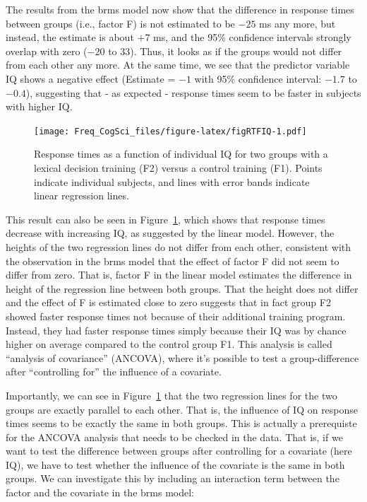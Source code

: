 \documentclass[12pt,]{krantz}
\begin{document}
The results from the brms model now show that the difference in response times between groups (i.e., factor F) is not estimated to be \(-25\) ms any more, but instead, the estimate is about \(+7\) ms, and the 95\% confidence intervals strongly overlap with zero (\(-20\) to \(33\)). Thus, it looks as if the groups would not differ from each other any more. At the same time, we see that the predictor variable IQ shows a negative effect (Estimate = \(-1\) with 95\% confidence interval: \(-1.7\) to \(-0.4\)), suggesting that - as expected - response times seem to be faster in subjects with higher IQ.

\begin{figure}
\centering
\texttt{[image: Freq\_CogSci\_files/figure-latex/figRTFIQ-1.pdf]}
\caption{\label{fig:figRTFIQ}Response times as a function of individual IQ for two groups with a lexical decision training (F2) versus a control training (F1). Points indicate individual subjects, and lines with error bands indicate linear regression lines.}
\end{figure}

This result can also be seen in Figure~\ref{fig:figRTFIQ}, which shows that response times decrease with increasing IQ, as suggested by the linear model. However, the heights of the two regression lines do not differ from each other, consistent with the observation in the brms model that the effect of factor F did not seem to differ from zero. That is, factor F in the linear model estimates the difference in height of the regression line between both groups.
That the height does not differ and the effect of F is estimated close to zero suggests that in fact group F2 showed faster response times not because of their additional training program. Instead, they had faster response times simply because their IQ was by chance higher on average compared to the control group F1. This analysis is called ``analysis of covariance'' (ANCOVA), where it's possible to test a group-difference after ``controlling for'' the influence of a covariate.

Importantly, we can see in Figure~\ref{fig:figRTFIQ} that the two regression lines for the two groups are exactly parallel to each other. That is, the influence of IQ on response times seems to be exactly the same in both groups. This is actually a prerequiste for the ANCOVA analysis that needs to be checked in the data. That is, if we want to test the difference between groups after controlling for a covariate (here IQ), we have to test whether the influence of the covariate is the same in both groups. We can investigate this by including an interaction term between the factor and the covariate in the brms model:
\end{document}
